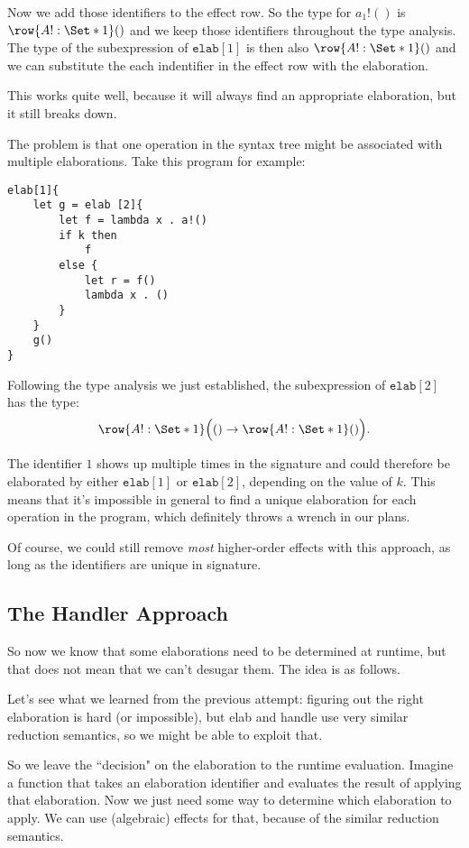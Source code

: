 \documentclass{article}
\newcommand\kw[1]{\ensuremath{\mathbf{\mathtt{#1}}}}
\newcommand\unit{\kw{()}}
\newcommand\elab{\kw{elab}}
\renewcommand\S{\Set*}
\begin{document}
Now we add those identifiers to the effect row. So the type for $a_1!()$ is $\row{A!: \S{1}} ()$ and we keep those identifiers throughout the type analysis. The type of the subexpression of $\elab[1]{}$ is then also $\row{A!: \S{1}} ()$ and we can substitute the each indentifier in the effect row with the elaboration.

This works quite well, because it will always find an appropriate elaboration, but it still breaks down.

The problem is that one operation in the syntax tree might be associated with multiple elaborations. Take this program for example:

\begin{lstlisting}
elab[1]{
    let g = elab [2]{
        let f = lambda x . a!()
        if k then
            f
        else {
            let r = f()
            lambda x . ()
        }
    }
    g()
}
\end{lstlisting}

Following the type analysis we just established, the subexpression of $\elab[2]{}$ has the type:
\[
    \row{A!: \S{1}} \Big(\unit \to \row{A!: \S{1}} \unit\Big).
\]

The identifier $1$ shows up multiple times in the signature and could therefore be elaborated by either $\elab[1]$ or $\elab[2]$, depending on the value of $k$. This means that it's impossible in general to find a unique elaboration for each operation in the program, which definitely throws a wrench in our plans.

Of course, we could still remove \emph{most} higher-order effects with this approach, as long as the identifiers are unique in signature.

\subsection{The Handler Approach}

So now we know that some elaborations need to be determined at runtime, but that does not mean that we can't desugar them. The idea is as follows.

Let's see what we learned from the previous attempt: figuring out the right elaboration is hard (or impossible), but elab and handle use very similar reduction semantics, so we might be able to exploit that.

So we leave the ``decision" on the elaboration to the runtime evaluation. Imagine a function that takes an elaboration identifier and evaluates the result of applying that elaboration. Now we just need some way to determine which elaboration to apply. We can use (algebraic) effects for that, because of the similar reduction semantics.
\end{document}
